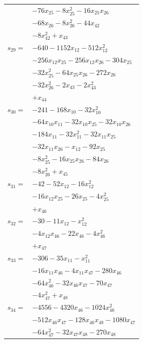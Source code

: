 \begin{longtable}{@{}r@{\;}l@{}}
 & \(\displaystyle -76x_{25} -8x_{25}^{2} -16x_{25}x_{26}\) \\
 & \(\displaystyle -68x_{26} -8x_{26}^{2} -44x_{42}\) \\
 & \(\displaystyle -8x_{42}^{2} +x_{43}\) \\[3pt]
\(s_{29}=\) & \(\displaystyle -640 -1152x_{12} -512x_{12}^{2}\) \\
 & \(\displaystyle -256x_{12}x_{25} -256x_{12}x_{26} -304x_{25}\) \\
 & \(\displaystyle -32x_{25}^{2} -64x_{25}x_{26} -272x_{26}\) \\
 & \(\displaystyle -32x_{26}^{2} -2x_{43} -2x_{43}^{2}\) \\
 & \(\displaystyle +x_{44}\) \\[3pt]
\(s_{30}=\) & \(\displaystyle -241 -168x_{10} -32x_{10}^{2}\) \\
 & \(\displaystyle -64x_{10}x_{11} -32x_{10}x_{25} -32x_{10}x_{26}\) \\
 & \(\displaystyle -184x_{11} -32x_{11}^{2} -32x_{11}x_{25}\) \\
 & \(\displaystyle -32x_{11}x_{26} -x_{12} -92x_{25}\) \\
 & \(\displaystyle -8x_{25}^{2} -16x_{25}x_{26} -84x_{26}\) \\
 & \(\displaystyle -8x_{26}^{2} +x_{45}\) \\[3pt]
\(s_{31}=\) & \(\displaystyle -42 -52x_{12} -16x_{12}^{2}\) \\
 & \(\displaystyle -16x_{12}x_{25} -26x_{25} -4x_{25}^{2}\) \\
 & \(\displaystyle +x_{46}\) \\[3pt]
\(s_{32}=\) & \(\displaystyle -30 -11x_{12} -x_{12}^{2}\) \\
 & \(\displaystyle -4x_{12}x_{46} -22x_{46} -4x_{46}^{2}\) \\
 & \(\displaystyle +x_{47}\) \\[3pt]
\(s_{33}=\) & \(\displaystyle -306 -35x_{11} -x_{11}^{2}\) \\
 & \(\displaystyle -16x_{11}x_{46} -4x_{11}x_{47} -280x_{46}\) \\
 & \(\displaystyle -64x_{46}^{2} -32x_{46}x_{47} -70x_{47}\) \\
 & \(\displaystyle -4x_{47}^{2} +x_{48}\) \\[3pt]
\(s_{34}=\) & \(\displaystyle -4556 -4320x_{46} -1024x_{46}^{2}\) \\
 & \(\displaystyle -512x_{46}x_{47} -128x_{46}x_{48} -1080x_{47}\) \\
 & \(\displaystyle -64x_{47}^{2} -32x_{47}x_{48} -270x_{48}\) \\

\end{longtable}
